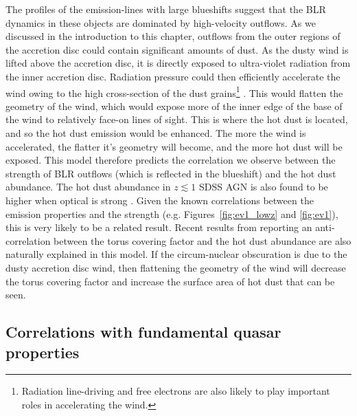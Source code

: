 The profiles of the emission-lines with large  blueshifts suggest that the BLR dynamics in these objects are dominated by high-velocity outflows. 
As we discussed in the introduction to this chapter, outflows from the outer regions of the accretion disc could contain significant amounts of dust. 
As the dusty wind is lifted above the accretion disc, it is directly exposed to ultra-violet radiation from the inner accretion disc. 
Radiation pressure could then efficiently accelerate the wind owing to the high cross-section of the dust grains\footnote{Radiation line-driving and free electrons are also likely to play important roles in accelerating the wind.} \citep[e.g.][]{fabian12}.   
This would flatten the geometry of the wind, which would expose more of the inner edge of the base of the wind to relatively face-on lines of sight. 
This is where the hot dust is located, and so the hot dust emission would be enhanced. 
The more the wind is accelerated, the flatter it's geometry will become, and the more hot dust will be exposed.
This model therefore predicts the correlation we observe between the strength of BLR outflows (which is reflected in the  blueshift) and the hot dust abundance. 
The hot dust abundance in $z\lesssim1$ SDSS AGN is also found to be higher when optical  is strong \citep{shen14}. 
Given the known correlations between the  emission properties and the  strength (e.g. Figures~\ref{fig:ev1_lowz} and \ref{fig:ev1}), this is very likely to be a related result. 
Recent results from \citet{roseboom13} reporting an anti-correlation between the torus covering factor and the hot dust abundance are also naturally explained in this model.
If the circum-nuclear obscuration is due to the dusty accretion disc wind, then flattening the geometry of the wind will decrease the torus covering factor and increase the surface area of hot dust that can be seen. 

\subsection{Correlations with fundamental quasar properties}

